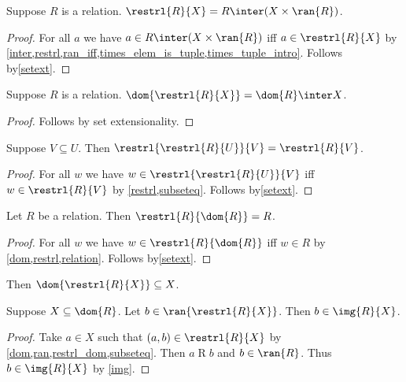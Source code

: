 \begin{proposition}\label{restrl_eq_inter}
    Suppose $R$ is a relation.
    $\restrl{R}{X} = R\inter (X\times \ran{R})$.
\end{proposition}
\begin{proof}
    For all $a$ we have $a\in R\inter (X\times \ran{R})$ iff $a\in \restrl{R}{X}$
        by \cref{inter,restrl,ran_iff,times_elem_is_tuple,times_tuple_intro}.
    Follows by\cref{setext}.
\end{proof}

\begin{corollary}%
\label{dom_of_restrl_eq_inter}
    Suppose $R$ is a relation.
    $\dom{\restrl{R}{X}} = \dom{R}\inter X$.
\end{corollary}
\begin{proof}
    Follows by set extensionality.
\end{proof}

\begin{proposition}\label{restrl_restrl}
    Suppose $V\subseteq U$.
    Then $\restrl{\restrl{R}{U}}{V} = \restrl{R}{V}$.
\end{proposition}
\begin{proof}
    For all $w$ we have $w\in\restrl{\restrl{R}{U}}{V}$ iff $w\in\restrl{R}{V}$
        by \cref{restrl,subseteq}.
    Follows by\cref{setext}.
\end{proof}

\begin{proposition}\label{restrl_by_dom}
    Let $R$ be a relation.
    Then $\restrl{R}{\dom{R}} = R$.
\end{proposition}
\begin{proof}
    For all $w$ we have $w\in\restrl{R}{\dom{R}}$ iff $w\in R$
        by \cref{dom,restrl,relation}.
    Follows by\cref{setext}.
\end{proof}

\begin{proposition}\label{restrl_dom}
    Then $\dom{\restrl{R}{X}}\subseteq X$.
\end{proposition}

\begin{proposition}\label{restrl_ran_elim}
    Suppose $X\subseteq\dom{R}$.
    Let $b\in\ran{\restrl{R}{X}}$.
    Then $b\in\img{R}{X}$.
\end{proposition}
\begin{proof}
    Take $a\in X$ such that $(a, b)\in \restrl{R}{X}$
        by \cref{dom,ran,restrl_dom,subseteq}.
    Then $a\mathrel{R} b$ and $b\in\ran{R}$.
    Thus $b\in\img{R}{X}$ by \cref{img}.
\end{proof}

